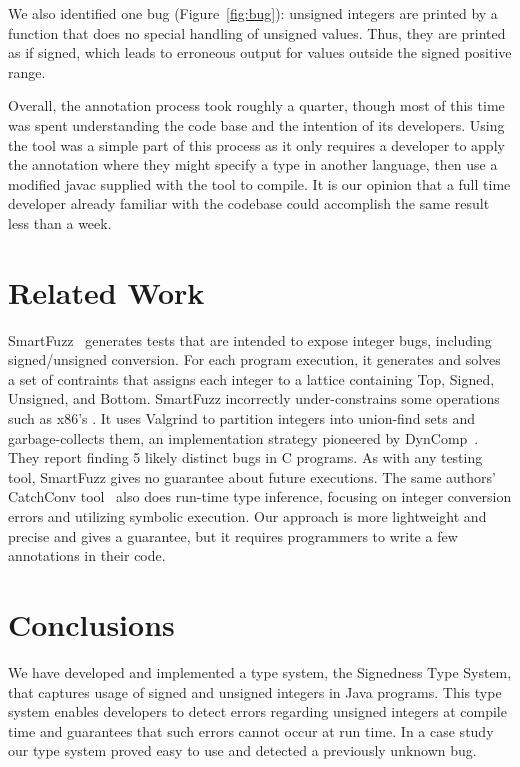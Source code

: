 \documentclass{sig-alternate-05-2015}
\def\<#1>{\codeid{#1}}
\begin{document}
We also identified one bug (Figure~\ref{fig:bug}):
unsigned integers are printed by a function that does no special handling
of unsigned values.  Thus, they are printed as
if signed, which leads to erroneous output for values outside the signed
positive range.

Overall, the annotation process took roughly a quarter, though most of this time
was spent understanding the code base and the intention of its developers. Using
the tool was a simple part of this process as it only requires a developer to
apply the \<@Unsigned> annotation where they might specify a type in another language,
then use a modified javac supplied with the tool to compile.
It is our opinion that a full time developer already familiar with the codebase
could accomplish the same result less than a week.


\section{Related Work}

SmartFuzz~\cite{MolnarLW2009} generates tests that are intended to expose
integer bugs, including signed/unsigned conversion.  For each program
execution, it generates and solves a set of contraints that assigns each
integer to a lattice containing Top, Signed, Unsigned, and Bottom.
SmartFuzz incorrectly under-constrains some operations such as x86's
\<IMUL>.  It uses Valgrind to partition integers into union-find sets and
garbage-collects them, an implementation strategy pioneered by
DynComp~\cite{GuoPME2006}.  They report finding 5 likely distinct bugs in C
programs.  As with any testing tool, SmartFuzz gives no guarantee about
future executions.  The same authors' CatchConv tool~\cite{MolnarW2007}
also does run-time type inference, focusing on integer conversion errors
and utilizing symbolic execution.  Our approach is more lightweight and
precise and gives a guarantee, but it requires programmers to write a few
annotations in their code.


\section{Conclusions}

We have developed and implemented a type system, the Signedness Type System, that
captures usage of signed and unsigned
integers in Java programs.
This type system enables developers to detect errors regarding unsigned
integers at compile time and guarantees that such errors cannot occur at
run time.
In a case study our type system proved easy to use and detected a
previously unknown bug.
\end{document}
